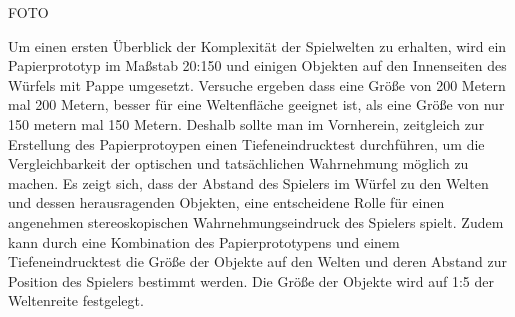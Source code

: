 
FOTO

Um einen ersten Überblick der Komplexität der Spielwelten zu erhalten, wird ein Papierprototyp im Maßstab 20:150 und einigen Objekten auf den Innenseiten des Würfels mit Pappe umgesetzt. Versuche ergeben dass eine Größe von 200 Metern mal 200 Metern, besser für eine Weltenfläche geeignet ist, als eine Größe von nur 150 metern mal 150 Metern. Deshalb sollte man im Vornherein, zeitgleich zur Erstellung des Papierprotoypen einen Tiefeneindrucktest durchführen, um die Vergleichbarkeit der optischen und tatsächlichen Wahrnehmung möglich zu machen. Es zeigt sich, dass der Abstand des Spielers im Würfel zu den Welten und dessen herausragenden Objekten, eine entscheidene Rolle für einen angenehmen stereoskopischen Wahrnehmungseindruck des Spielers spielt. Zudem kann durch eine Kombination des Papierprototypens und einem Tiefeneindrucktest die Größe der Objekte auf den Welten und deren Abstand zur Position des Spielers bestimmt werden. Die Größe der Objekte wird auf 1:5 der Weltenreite festgelegt.